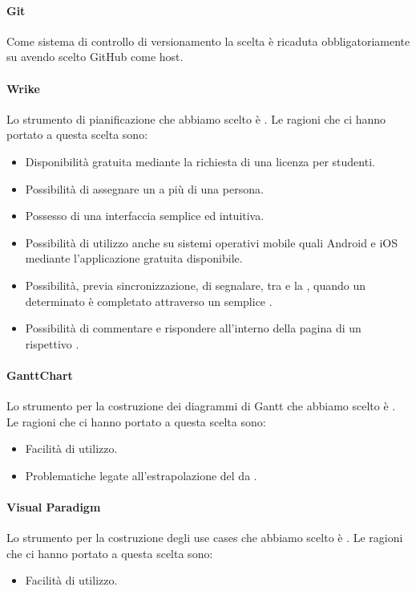 \paragraph{Git}
Come sistema di controllo di versionamento la scelta è ricaduta obbligatoriamente su  avendo scelto GitHub come host.

\paragraph{Wrike}
Lo strumento di pianificazione che abbiamo scelto è .
Le ragioni che ci hanno portato a questa scelta sono:

\begin{itemize}
\item Disponibilità gratuita mediante la richiesta di una licenza per studenti.
\item Possibilità di assegnare un  a più di una persona.
\item Possesso di una interfaccia semplice ed intuitiva.
\item Possibilità di utilizzo anche su sistemi operativi mobile quali Android e iOS mediante l'applicazione gratuita disponibile.
\item Possibilità, previa sincronizzazione, di segnalare, tra  e la  , quando un determinato  è completato attraverso un semplice .
\item Possibilità di commentare e rispondere all'interno della pagina di un rispettivo .

\end{itemize}

\paragraph{GanttChart}
Lo strumento per la costruzione dei diagrammi di Gantt che abbiamo scelto è .
Le ragioni che ci hanno portato a questa scelta sono:

\begin{itemize}
\item Facilità di utilizzo.
\item Problematiche legate all'estrapolazione del  da .
\end{itemize}

\paragraph{Visual Paradigm}
Lo strumento per la costruzione degli use cases che abbiamo scelto è .
Le ragioni che ci hanno portato a questa scelta sono:
\begin{itemize}
\item Facilità di utilizzo.
\end{itemize}
\newpage 